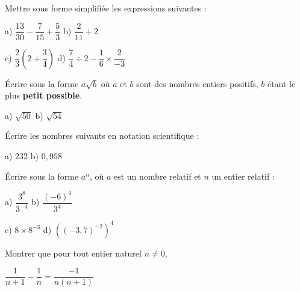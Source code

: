 \documentclass[12pt,a4paper]{exam}
\begin{document}
\vspace{10pt}
\begin{questions}

\question[4] Mettre sous forme simplifiée les expressions suivantes :

\vspace{5pt}
\hspace{1.85cm} a) $\dfrac{13}{30} - \dfrac{7}{15} + \dfrac{5}{3}$ \hspace{2cm} b) $\dfrac{2}{11} + 2$

\vspace{10pt}
\hspace{1.85cm} c) $\dfrac{2}{3}\left(2+\dfrac{3}{4}\right)$ \hspace{2.3cm} 
d) $\dfrac{7}{4} \div 2 - \dfrac{1}{6} \times \dfrac{2}{-3}$

\vspace{10pt}
\question[1] Écrire sous la forme $a\sqrt{b}$ où $a$ et $b$ sont des nombres entiers positifs, $b$ étant le plus 
\textbf{petit possible}.

\vspace{5pt}
\hspace{1.85cm} a) $\sqrt{50}$ \hspace{2cm} b) $\sqrt{54}$

\vspace{10pt}
\question[1] Écrire les nombres suivants en notation scientifique :

\vspace{5pt}
\hspace{1.85cm} a) $232$ \hspace{2cm} b) $0,958$

\vspace{10pt}
\question[2] Écrire sous la forme $a^n$, où $a$ est un nombre relatif et $n$ un entier relatif :

\vspace{5pt}
\hspace{1.85cm} a) $\dfrac{3^8}{3^{-4}}$ \hspace{2cm} b) $\dfrac{(-6)^4}{3^4}$

\vspace{5pt}
\hspace{1.85cm} c) $8 \times 8^{-3}$ \hspace{1.4cm} d) $((-3,7)^{-2})^4$

\vspace{10pt}
\question[1] Montrer que pour tout entier naturel $n \neq 0$,

\vspace{5pt}
\hspace{4cm} $\dfrac{1}{n+1} - \dfrac{1}{n} = \dfrac{-1}{n(n+1)}$


\end{questions}
\end{document}

